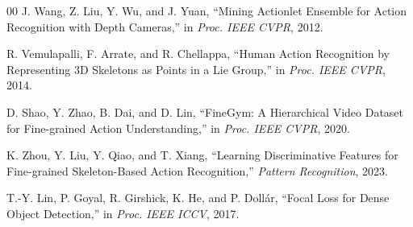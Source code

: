 \documentclass[conference]{IEEEtran}
\begin{document}
\begin{thebibliography}{00}
J. Wang, Z. Liu, Y. Wu, and J. Yuan,
``Mining Actionlet Ensemble for Action Recognition with Depth Cameras,''
in \textit{Proc. IEEE CVPR}, 2012.

R. Vemulapalli, F. Arrate, and R. Chellappa,
``Human Action Recognition by Representing 3D Skeletons as Points in a
Lie Group,''
in \textit{Proc. IEEE CVPR}, 2014.

D. Shao, Y. Zhao, B. Dai, and D. Lin,
``FineGym: A Hierarchical Video Dataset for Fine-grained Action
Understanding,''
in \textit{Proc. IEEE CVPR}, 2020.

K. Zhou, Y. Liu, Y. Qiao, and T. Xiang,
``Learning Discriminative Features for Fine-grained Skeleton-Based
Action Recognition,''
\textit{Pattern Recognition}, 2023.

T.-Y. Lin, P. Goyal, R. Girshick, K. He, and P. Dollár,
``Focal Loss for Dense Object Detection,''
in \textit{Proc. IEEE ICCV}, 2017.

\end{thebibliography}
\end{document}
